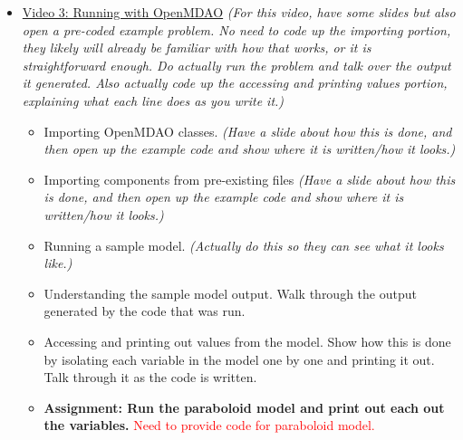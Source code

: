 \documentclass[12pt, letterpaper]{article}
\begin{document}
\begin{itemize}
	\item \underline{Video 3: Running with OpenMDAO} \textit{(For this video, have some slides but also open a pre-coded example problem. No need to code up the importing portion, they likely will already be familiar with how that works, or it is straightforward enough. Do actually run the problem and talk over the output it generated. Also actually code up the accessing and printing values portion, explaining what each line does as you write it.)}
		\begin{itemize}
			\item Importing OpenMDAO classes. \textit{(Have a slide about how this is done, and then open up the example code and show where it is written/how it looks.)}
			\item Importing components from pre-existing files \textit{(Have a slide about how this is done, and then open up the example code and show where it is written/how it looks.)}
			\item Running a sample model. \textit{(Actually do this so they can see what it looks like.)}
			\item Understanding the sample model output. Walk through the output generated by the code that was run.
			\item Accessing and printing out values from the model. Show how this is done by isolating each variable in the model one by one and printing it out. Talk through it as the code is written.
			\item \textbf{Assignment: Run the paraboloid model and print out each out the variables.} \textcolor{red}{Need to provide code for paraboloid model.}
		\end{itemize}


\end{itemize}
\end{document}

